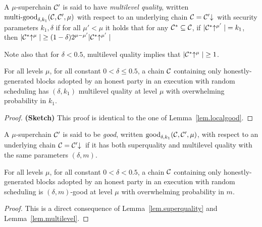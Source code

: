 \begin{definition}
A $\mu$-superchain $\mathcal{C}'$ is said to have \textit{multilevel quality}, written
$\textnormal{multi-good}_{\delta, k_1}(\mathcal{C}, \mathcal{C}', \mu)$ with respect to an
underlying chain $\mathcal{C} = \mathcal{C}'\negthickspace\downarrow\,$ with security parameters $k_1,
\delta$ if for all $\mu' < \mu$ it holds that for any $\mathcal{C}^* \subseteq \mathcal{C}$,
if $|\mathcal{C}^*\negthickspace\uparrow^{\mu'}| = k_1$, then $|\mathcal{C}^*\negthickspace\uparrow^{\mu}| \geq (1 -
\delta)2^{\mu - \mu'}|\mathcal{C}^*\negthickspace\uparrow^{\mu'}|$
\end{definition}

Note also that for $\delta < 0.5$, multilevel quality implies that
$|\mathcal{C}^*\negthickspace\uparrow^{\mu}| \geq 1$.

\begin{lemma}\label{lem.multilevel}
For all levels $\mu$, for all constant $0 < \delta \leq 0.5$, a chain $\mathcal{C}$
containing only honestly-generated blocks adopted by an honest party in an
execution with random scheduling has $(\delta, k_1)$ multilevel quality at level
$\mu$ with overwhelming probability in $k_1$.
\end{lemma}
\ifonecolumn
\begin{proof}\textbf{(Sketch)}
This proof is identical to the one of Lemma~\ref{lem.localgood}.
\Qed
\end{proof}
\fi

\begin{definition}\label{lem.good}
A $\mu$-superchain $\mathcal{C}'$ is said to be \textit{good}, written
$\textnormal{good}_{\delta, k_1}(\mathcal{C}, \mathcal{C}', \mu)$, with respect to an
underlying chain $\mathcal{C} = \mathcal{C}'\negthickspace\downarrow\,$ if it has both superquality and multilevel quality with the same parameters $(\delta, m)$.
\end{definition}

\begin{corollary}
\label{crly.superchain-distribution}
For all levels $\mu$, for all constant $0 < \delta < 0.5$, a chain
$\mathcal{C}$ containing only honestly-generated blocks adopted by an honest party in
an execution with random scheduling is $(\delta, m)$-good at level
$\mu$ with overwhelming probability in $m$.
\end{corollary}
\ifonecolumn
\begin{proof}
This is a direct consequence of Lemma~\ref{lem.superquality} and
Lemma~\ref{lem.multilevel}. \Qed
\end{proof}
\fi
